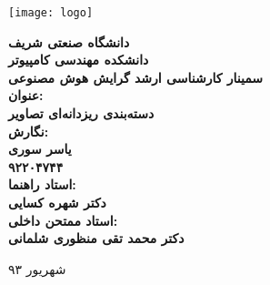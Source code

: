 \thispagestyle{empty}
\begin{center}
\texttt{[image: logo]}
\vskip 1cm
{\bf
دانشگاه صنعتی شریف\\ دانشکده مهندسی کامپیوتر\\ سمینار کارشناسی ارشد گرایش هوش مصنوعی\\
\vskip 1cm
عنوان:\\
دسته‌بندی ریزدانه‌ای  تصاویر‬\\
\vskip 1cm
نگارش:\\
یاسر سوری\\
۹۲۲۰۴۷۴۴\\
\vskip 1cm
استاد راهنما:\\
دکتر شهره کسایی\\
\vskip 1cm
استاد ممتحن داخلی:\\
دکتر محمد تقی منظوری شلمانی\\

\vskip 3.5cm

}
شهریور ۹۳
\newpage
\end{center}


